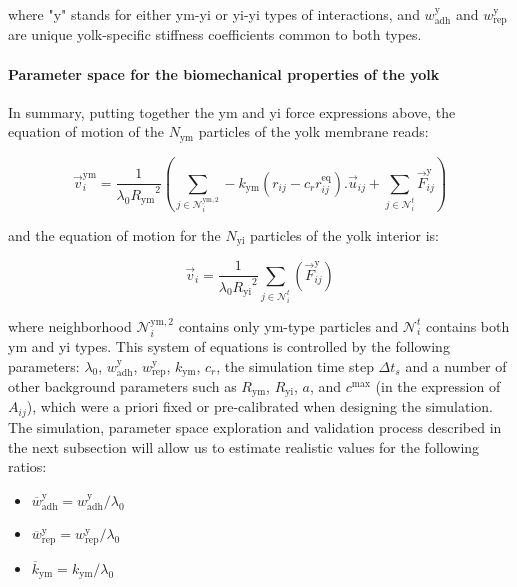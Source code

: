 where "y" stands for either ym-yi or yi-yi types of interactions, and $w^{\mathrm{y}}_{\mathrm{adh}}$ and $w^{\mathrm{y}}_{\mathrm{rep}}$ are unique yolk-specific stiffness coefficients common to both types.

\paragraph{Parameter space for the biomechanical properties of the yolk}


In summary, putting together the ym and yi force expressions above, the equation of motion of the $N_{\mathrm{ym}}$ particles of the yolk membrane reads:

$$\vec{v}^{\mathrm{ym}}_{i} =  \frac{1}{\lambda_{0} {R_{\mathrm{ym}}}^2} \left( \sum_{j \in \mathcal{N}^{\mathrm{ym},2}_i} -k_{\mathrm{ym}} (r_{ij} - c_r r^{\mathrm{eq}}_{ij}).\vec{u}_{ij} + \sum_{j \in \mathcal{N}^t_i} \vec{F}^{\mathrm{y}}_{ij} \right)$$

and the equation of motion for the $N_{\mathrm{yi}}$ particles of the yolk interior is:

$$\vec{v}_{i} =  \frac{1}{\lambda_{0} {R_{\mathrm{yi}}}^2} \sum_{j \in \mathcal{N}^t_i} \left( \vec{F}^{\mathrm{y}}_{ij} \right)$$

where neighborhood $\mathcal{N}^{\mathrm{ym},2}_i$ contains only ym-type particles and $\mathcal{N}^t_i$ contains both ym and yi types. This system of equations is controlled by the following parameters: $\lambda_0$, $w^{\mathrm{y}}_{\mathrm{adh}}$, $w^{\mathrm{y}}_{\mathrm{rep}}$, $k_{\mathrm{ym}}$, $c_r$, the simulation time step $\Delta\!t_s$ and a number of other background parameters such as $R_{\mathrm{ym}}$, $R_{\mathrm{yi}}$, $a$, and $c^{\mathrm{max}}$ (in the expression of $A_{ij}$), which were a priori fixed or pre-calibrated when designing the simulation. The simulation, parameter space exploration and validation process described in the next subsection will allow us to estimate realistic values for the following ratios:
\begin{itemize}
	\item $\overline{w}^{\mathrm{y}}_{\mathrm{adh}} = w^{\mathrm{y}}_{\mathrm{adh}}/\lambda_0$
	\item $\overline{w}^{\mathrm{y}}_{\mathrm{rep}} = w^{\mathrm{y}}_{\mathrm{rep}}/\lambda_0$
	\item $\overline{k}_{\mathrm{ym}} = k_{\mathrm{ym}}/\lambda_0$
\end{itemize}

